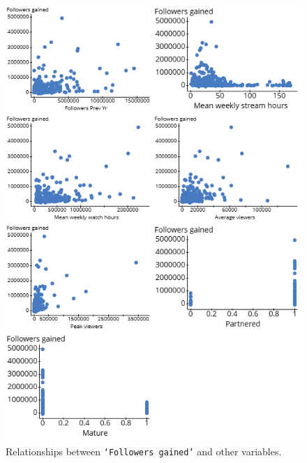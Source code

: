 \documentclass[12pt]{article}
\begin{document}
\begin{figure}[H]
  \centering
  \includegraphics[width=0.8\linewidth]{../StatCrunch_Results/follow_gain_scatter_matrix}
  \captionsetup{justification=centering, singlelinecheck=false, margin=2cm}
  \caption[Followers Gained Scatter Plot Matrix]{Relationships between \texttt{`Followers gained'} and other variables.}
  \label{fig:follow_gain_scatter_matrix}
\end{figure}
\end{document}
